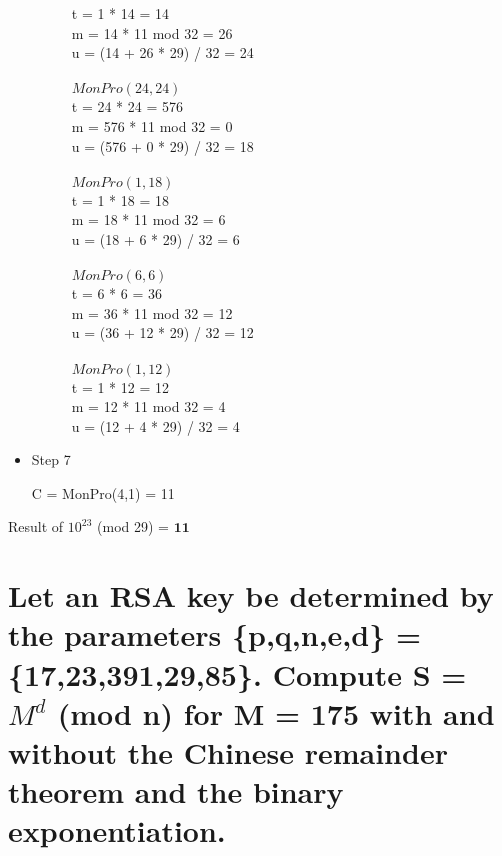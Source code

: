 \documentclass[11pt, pdftex]{article}
\begin{document}
\begin{itemize}
\begin{description}
t = 1 * 14 = 14\\
m = 14 * 11 mod 32 = 26\\
u = (14 + 26 * 29) / 32 = 24\\
\\
$MonPro(24,24)$\\
t = 24 * 24 = 576\\
m = 576 * 11 mod 32 = 0\\
u = (576 + 0 * 29) / 32 = 18\\
\\
$MonPro(1,18)$\\
t = 1 * 18 = 18\\
m = 18 * 11 mod 32 = 6\\
u = (18 + 6 * 29) / 32 = 6\\
\\
$MonPro(6,6)$\\
t = 6 * 6 = 36\\
m = 36 * 11 mod 32 = 12\\
u = (36 + 12 * 29) / 32 = 12\\
\\
$MonPro(1,12)$\\
t = 1 * 12 = 12\\
m = 12 * 11 mod 32 = 4\\
u = (12 + 4 * 29) / 32 = 4\\
\end{description}
\item Step 7
\begin{description}
C = MonPro(4,1) = 11
\end{description}
\end{itemize}
Result of $10^{23}$ (mod 29) = $\textbf{11}$
\section{Let an RSA key be determined by the parameters \{p,q,n,e,d\} = \{17,23,391,29,85\}. Compute S = $M^{d}$ (mod n) for M = 175 with and without the Chinese remainder theorem and the binary exponentiation.}
\end{document}

